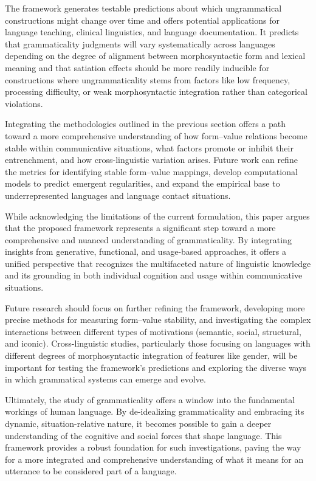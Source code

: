 \documentclass[12pt,letterpaper]{article}
\begin{document}
The framework generates testable predictions about which ungrammatical constructions might change over time and offers potential applications for language teaching, clinical linguistics, and language documentation. It predicts that grammaticality judgments will vary systematically across languages depending on the degree of alignment between morphosyntactic form and lexical meaning and that satiation effects should be more readily inducible for constructions where ungrammaticality stems from factors like low frequency, processing difficulty, or weak morphosyntactic integration rather than categorical violations.

Integrating the methodologies outlined in the previous section offers a path toward a more comprehensive understanding of how form--value relations become stable within communicative situations, what factors promote or inhibit their entrenchment, and how cross-linguistic variation arises. Future work can refine the metrics for identifying stable form--value mappings, develop computational models to predict emergent regularities, and expand the empirical base to underrepresented languages and language contact situations.

While acknowledging the limitations of the current formulation, this paper argues that the proposed framework represents a significant step toward a more comprehensive and nuanced understanding of grammaticality. By integrating insights from generative, functional, and usage-based approaches, it offers a unified perspective that recognizes the multifaceted nature of linguistic knowledge and its grounding in both individual cognition and usage within communicative situations.

Future research should focus on further refining the framework, developing more precise methods for measuring form--value stability, and investigating the complex interactions between different types of motivations (semantic, social, structural, and iconic). Cross-linguistic studies, particularly those focusing on languages with different degrees of morphosyntactic integration of features like gender, will be important for testing the framework's predictions and exploring the diverse ways in which grammatical systems can emerge and evolve.

Ultimately, the study of grammaticality offers a window into the fundamental workings of human language. By de-idealizing grammaticality and embracing its dynamic, situation-relative nature, it becomes possible to gain a deeper understanding of the cognitive and social forces that shape language. This framework provides a robust foundation for such investigations, paving the way for a more integrated and comprehensive understanding of what it means for an utterance to be considered part of a language.
\end{document}
